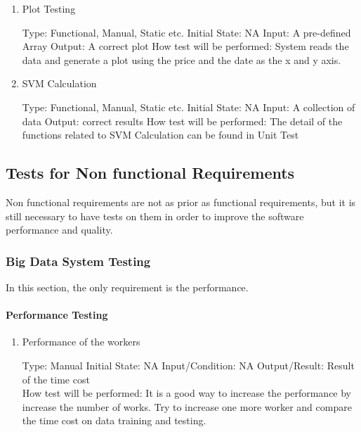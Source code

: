 \documentclass[12pt, titlepage]{article}
\begin{document}
\begin{enumerate}

\item{Plot Testing\\}

Type: Functional, Manual, Static etc.
Initial State: NA
Input: A pre-defined Array
Output: A correct plot
How test will be performed: System reads the data and generate a plot using the price and the date as the x and y axis.

\item{SVM Calculation \\}

Type: Functional, Manual, Static etc.
Initial State: NA
Input: A collection of data
Output: correct results
How test will be performed: The detail of the functions related to SVM Calculation can be found in Unit Test

\end{enumerate}


\subsection{Tests for Non functional Requirements}
Non functional requirements are not as prior as functional requirements, but it is still necessary to have tests on them in order to improve the software performance and quality.
\subsubsection{Big Data System Testing}
In this section, the only requirement is the performance.
\paragraph{ Performance Testing}

\begin{enumerate}

\item{Performance of the workers\\}

Type: Manual
Initial State: NA
Input/Condition: NA
Output/Result: Result of the time cost\\
How test will be performed: It is a good way to increase the performance by increase the number of works. Try to increase one more worker and compare the time cost on data training and testing.


\end{enumerate}
\end{document}
